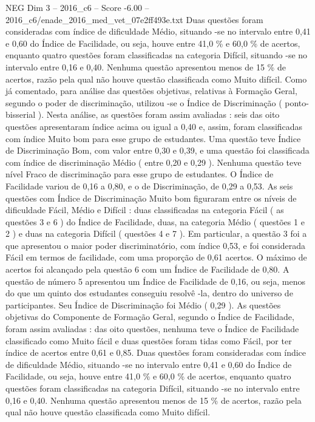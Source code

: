 \begin{textsample}{NEG Dim 3 – 2016\_c6 – Score -6.00 – 2016\_c6/enade\_2016\_med\_vet\_07e2ff493e.txt}
Duas questões foram consideradas com índice de dificuldade Médio, situando -se no intervalo entre 0,41 e 0,60 do Índice de Facilidade, ou seja, houve entre 41,0 \% e 60,0 \% de acertos, enquanto quatro questões foram classificadas na categoria Difícil, situando -se no intervalo entre 0,16 e 0,40.
Nenhuma questão apresentou menos de 15 \% de acertos, razão pela qual não houve questão classificada como Muito difícil.
Como já comentado, para análise das questões objetivas, relativas à Formação Geral, segundo o poder de discriminação, utilizou -se o Índice de Discriminação ( ponto-bisserial ).
Nesta análise, as questões foram assim avaliadas : seis das oito questões apresentaram índice acima ou igual a 0,40 e, assim, foram classificadas com índice Muito bom para esse grupo de estudantes.
Uma questão teve Índice de Discriminação Bom, com valor entre 0,30 e 0,39, e uma questão foi classificada com índice de discriminação Médio ( entre 0,20 e 0,29 ).
Nenhuma questão teve nível Fraco de discriminação para esse grupo de estudantes.
O Índice de Facilidade variou de 0,16 a 0,80, e o de Discriminação, de 0,29 a 0,53.
As seis questões com Índice de Discriminação Muito bom figuraram entre os níveis de dificuldade Fácil, Médio e Difícil : duas classificadas na categoria Fácil ( as questões 3 e 6 ) do Índice de Facilidade, duas, na categoria Médio ( questões 1 e 2 ) e duas na categoria Difícil ( questões 4 e 7 ).
Em particular, a questão 3 foi a que apresentou o maior poder discriminatório, com índice 0,53, e foi considerada Fácil em termos de facilidade, com uma proporção de 0,61 acertos.
O máximo de acertos foi alcançado pela questão 6 com um Índice de Facilidade de 0,80.
A questão de número 5 apresentou um Índice de Facilidade de 0,16, ou seja, menos do que um quinto dos estudantes conseguiu resolvê -la, dentro do universo de participantes.
Seu Índice de Discriminação foi Médio ( 0,29 ).
As questões objetivas do Componente de Formação Geral, segundo o Índice de Facilidade, foram assim avaliadas : das oito questões, nenhuma teve o Índice de Facilidade classificado como Muito fácil e duas questões foram tidas como Fácil, por ter índice de acertos entre 0,61 e 0,85.
Duas questões foram consideradas com índice de dificuldade Médio, situando -se no intervalo entre 0,41 e 0,60 do Índice de Facilidade, ou seja, houve entre 41,0 \% e 60,0 \% de acertos, enquanto quatro questões foram classificadas na categoria Difícil, situando -se no intervalo entre 0,16 e 0,40.
Nenhuma questão apresentou menos de 15 \% de acertos, razão pela qual não houve questão classificada como Muito difícil.

\end{textsample}
